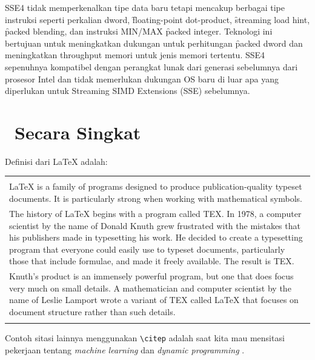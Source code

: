 SSE4 tidak memperkenalkan tipe data baru tetapi mencakup berbagai tipe instruksi seperti perkalian dword, \f{floating-point dot-product}, \f{streaming load hint}, \f{packed blending}, dan instruksi MIN/MAX \f{packed integer}. Teknologi ini bertujuan untuk meningkatkan dukungan untuk perhitungan \f{packed dword} dan meningkatkan throughput memori untuk jenis memori tertentu. SSE4 sepenuhnya kompatibel dengan perangkat lunak dari generasi sebelumnya dari prosesor Intel dan tidak memerlukan dukungan OS baru di luar apa yang diperlukan untuk Streaming SIMD Extensions (SSE) sebelumnya\cite{sse4reference}.



\iffalse
	\section{\latex~Secara Singkat}
	Definisi dari LaTeX \citep{lankton2008introduction} adalah: \\
	\begin{tabular}{| p{13cm} |}
		\hline
		\\
		LaTeX is a family of programs designed to produce publication-quality
		typeset documents. It is particularly strong when working with
		mathematical symbols.                                              \\
		The history of LaTeX begins with a program called TEX. In 1978, a
		computer scientist by the name of Donald Knuth grew frustrated with the
		mistakes that his publishers made in typesetting his work. He decided
		to create a typesetting program that everyone could easily use to
		typeset documents, particularly those that include formulae, and made
		it freely available. The result is TEX.                            \\
		Knuth's product is an immensely powerful program, but one that does
		focus very much on small details. A mathematician and computer
		scientist by the name of Leslie Lamport wrote a variant of TEX called
		LaTeX that focuses on document structure rather than such details. \\
		\\
		\hline
	\end{tabular}

	\vspace*{0.8cm}

	Contoh sitasi lainnya menggunakan \verb|\citep| adalah saat kita mau mensitasi pekerjaan tentang \textit{machine learning} \citep{chin2000learning} dan \textit{dynamic programming} \citep{barto1995learning}. \\


